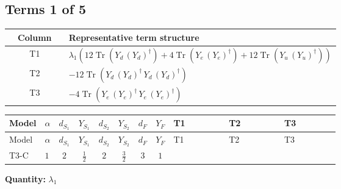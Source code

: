 \documentclass[8pt]{article}
\begin{document}
\begin{landscape}
\subsection*{Terms 1 of 5}
\begin{center}
\begin{tabular}{@{}c >{\raggedright\arraybackslash}p{0.82\linewidth}@{}}
\toprule
Column & Representative term structure \\
\midrule
T1 & \(\displaystyle {\lambda_1} (12 \operatorname{Tr}\!\left({Y_d}\,\left({Y_d}\right)^{\dagger}\right)+4 \operatorname{Tr}\!\left({Y_e}\,\left({Y_e}\right)^{\dagger}\right)+12 \operatorname{Tr}\!\left({Y_u}\,\left({Y_u}\right)^{\dagger}\right))\) \\
\midrule
T2 & \(\displaystyle -12 \operatorname{Tr}\!\left({Y_d}\,\left({Y_d}\right)^{\dagger}\,{Y_d}\,\left({Y_d}\right)^{\dagger}\right)\) \\
\midrule
T3 & \(\displaystyle -4 \operatorname{Tr}\!\left({Y_e}\,\left({Y_e}\right)^{\dagger}\,{Y_e}\,\left({Y_e}\right)^{\dagger}\right)\) \\
\midrule
\bottomrule
\end{tabular}
\end{center}
\smallskip
\tiny
\begin{longtable}{@{}llcccccc >{\raggedright\arraybackslash}p{0.21\linewidth} >{\raggedright\arraybackslash}p{0.21\linewidth} >{\raggedright\arraybackslash}p{0.21\linewidth}@{}}
\toprule
Model & $\alpha$ & $d_{S_1}$ & $Y_{S_1}$ & $d_{S_2}$ & $Y_{S_2}$ & $d_F$ & $Y_F$ & T1 & T2 & T3 \\
\midrule
\endfirsthead
\toprule
Model & $\alpha$ & $d_{S_1}$ & $Y_{S_1}$ & $d_{S_2}$ & $Y_{S_2}$ & $d_F$ & $Y_F$ & T1 & T2 & T3 \\
\midrule
\endhead
T3-C & $1$ & $2$ & $\frac{1}{2}$ & $2$ & $\frac{3}{2}$ & $3$ & $1$ & \scriptsize\adjustbox{max width=\linewidth}{$\begin{gathered} {\lambda_1} (12 \operatorname{Tr}\!\left({Y_d}\,\left({Y_d}\right)^{\dagger}\right)+4 \operatorname{Tr}\!\left({Y_e}\,\left({Y_e}\right)^{\dagger}\right)+12 \operatorname{Tr}\!\left({Y_u}\,\left({Y_u}\right)^{\dagger}\right))\end{gathered}$} & \scriptsize\adjustbox{max width=\linewidth}{$\begin{gathered} -12 \operatorname{Tr}\!\left({Y_d}\,\left({Y_d}\right)^{\dagger}\,{Y_d}\,\left({Y_d}\right)^{\dagger}\right)\end{gathered}$} & \scriptsize\adjustbox{max width=\linewidth}{$\begin{gathered} -4 \operatorname{Tr}\!\left({Y_e}\,\left({Y_e}\right)^{\dagger}\,{Y_e}\,\left({Y_e}\right)^{\dagger}\right)\end{gathered}$} \\
\midrule
\bottomrule
\end{longtable}
\clearpage
\noindent\textbf{Quantity: }$\lambda_1$\par\smallskip

\end{landscape}
\end{document}
